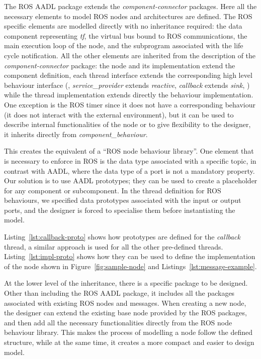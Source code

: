 The ROS AADL package extends the \textit{component-connector} packages. Here all the necessary elements to model ROS nodes and architectures are defined. The ROS specific elements are modelled directly with no inheritance required: the data component representing \textit{tf}, the virtual bus bound to ROS communications, the main execution loop of the node, and the subprogram associated with the life cycle notification. All the other elements are inherited from the description of the \textit{component-connector} package: the node and its implementation extend the component definition, each thread interface extends the corresponding high level behaviour interface (\eg, \textit{service\_provider} extends \textit{reactive}, \textit{callback} extends \textit{sink}, \etc) while the thread implementation extends directly the behaviour implementation. One exception is the ROS timer since it does not have a corresponding behaviour (it does not interact with the external environment), but it can be used to describe internal functionalities of the node or to give flexibility to the designer, it inherits directly from \textit{component\_behaviour}.

This creates the equivalent of a ``ROS node behaviour library''. One element that is necessary to enforce in ROS is the data type associated with a specific topic, in contrast with AADL, where the data type of a port is not a mandatory property. Our solution is to use AADL prototypes; they can be used to create a placeholder for any component or subcomponent. In the thread definition for ROS behaviours, we specified data prototypes associated with the input or output ports, and the designer is forced to specialise them before instantiating the model.

Listing~\ref{lst:callback-proto} shows how prototypes are defined for the \textit{callback} thread, a similar approach is used for all the other pre-defined threads. Listing~\ref{lst:impl-proto} shows how they can be used to define the implementation of the node shown in Figure~\ref{fig:sample-node} and Listings~\ref{lst:message-example}.

At the lower level of the inheritance, there is a specific package to be designed. Other than including the ROS AADL package, it includes all the packages associated with existing ROS nodes and messages. When creating a new node, the designer can extend the existing base node provided by the ROS packages, and then add all the necessary functionalities directly from the ROS node behaviour library. This makes the process of modelling a node follow the defined structure, while at the same time, it creates a more compact and easier to design model. 

